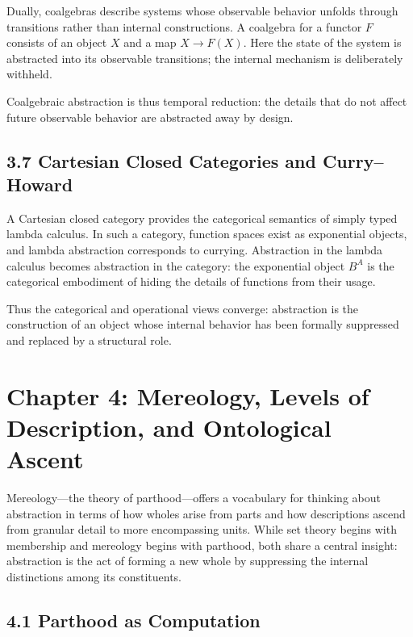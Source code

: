 \documentclass[11pt,letterpaper]{article}
\begin{document}
Dually, coalgebras describe systems whose observable behavior unfolds through transitions rather than internal constructions. A coalgebra for a functor \(F\) consists of an object \(X\) and a map \(X \to F(X)\). Here the state of the system is abstracted into its observable transitions; the internal mechanism is deliberately withheld.

Coalgebraic abstraction is thus temporal reduction: the details that do not affect future observable behavior are abstracted away by design.

\subsection{3.7 Cartesian Closed Categories and Curry--Howard}

A Cartesian closed category provides the categorical semantics of simply typed lambda calculus. In such a category, function spaces exist as exponential objects, and lambda abstraction corresponds to currying. Abstraction in the lambda calculus becomes abstraction in the category: the exponential object \(B^A\) is the categorical embodiment of hiding the details of functions from their usage.

Thus the categorical and operational views converge: abstraction is the construction of an object whose internal behavior has been formally suppressed and replaced by a structural role.

\newpage

\section{Chapter 4: Mereology, Levels of Description, and Ontological Ascent}

Mereology—the theory of parthood—offers a vocabulary for thinking about abstraction in terms of how wholes arise from parts and how descriptions ascend from granular detail to more encompassing units. While set theory begins with membership and mereology begins with parthood, both share a central insight: abstraction is the act of forming a new whole by suppressing the internal distinctions among its constituents.

\subsection{4.1 Parthood as Computation}
\end{document}
